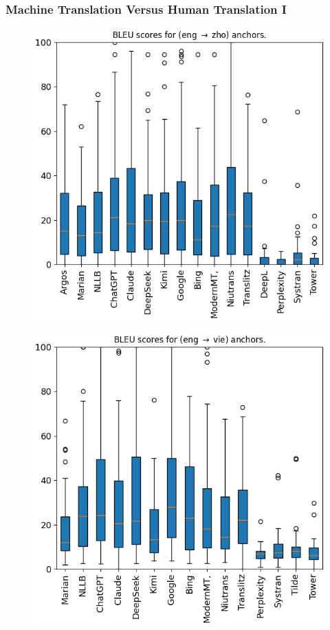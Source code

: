 \documentclass[aspectratio=169]{beamer}
\begin{document}
\begin{frame}[fragile]
	\frametitle{Machine Translation Versus Human Translation I}
    \begin{minipage}{.50\textwidth}
    \begin{figure}
        \centering
        \includegraphics[width=1.0\textwidth]{images/eval-01-Chinese-Anchors-bleu.png} 
    \end{figure}
    \end{minipage}%
    \begin{minipage}{.50\textwidth}
    \begin{figure}
        \centering
        \includegraphics[width=1.0\textwidth]{images/eval-01-Vietnamese-Anchors-bleu.png} 
    \end{figure}
    \end{minipage}
\end{frame}
\end{document}
